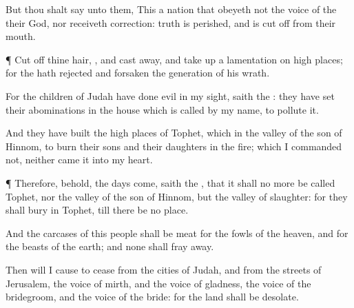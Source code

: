 {But thou shalt
say unto them, This
{} a
nation that
obeyeth not the
voice of the
{} their
God, nor
receiveth
correction:
truth is
perished, and is cut
off from their
mouth.


\par }{\PP {}¶ Cut
off thine
hair,
{}, and cast
{}
away, and take
up a
lamentation on high
places; for the
{} hath
rejected and
forsaken the
generation of his
wrath.

For the
children of
Judah have
done
evil in my
sight,
saith the
{}: they have
set their
abominations in the
house which is
called by my
name, to
pollute it.

And they have
built the high
places of
Tophet, which
{} in the
valley of the
son of
Hinnom, to
burn their
sons and their
daughters in the
fire; which I
commanded
{} not, neither
came it into my
heart.


\par }{\PP {}¶ Therefore, behold, the
days
come,
saith the
{}, that it shall no more be
called
Tophet, nor the
valley of the
son of
Hinnom, but the
valley of
slaughter: for they shall
bury in
Tophet, till there be
no
place.

And the
carcases of this
people shall be
meat for the
fowls of the
heaven, and for the
beasts of the
earth; and none shall fray
{}
away.

Then will I cause to
cease from the
cities of
Judah, and from the
streets of
Jerusalem, the
voice of
mirth, and the
voice of
gladness, the
voice of the
bridegroom, and the
voice of the
bride: for the
land shall be
desolate.




\par }
